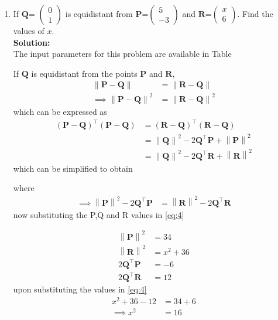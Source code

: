 \documentclass[12pt]{article}
\providecommand{\brak}[1]{\ensuremath{\left(#1\right)}}
\providecommand{\norm}[1]{\left\lVert#1\right\rVert}
\newcommand{\solution}{\noindent \textbf{Solution: }}
\newcommand{\myvec}[1]{\ensuremath{\begin{pmatrix}#1\end{pmatrix}}}
\let\vec\mathbf
\begin{document}
\begin{enumerate}

\item If $\vec{Q}$= $\myvec{0\\ 1}$  is equidistant from $\vec{P}$=$\myvec{5 \\ -3}$ and $\vec{R}$=$\myvec{x\\6}$. Find the values of $x$.\\

\solution \\The input parameters for this problem are available in Table
\begin{table}[ht!]\centering

\caption{}
\label{Table-1}	
\end{table}


  If $\vec{Q}$  is  equidistant from the points $\vec{P}$ and $\vec{R}$, 
\begin{align}
 \norm{\vec{P}-\vec{Q}} &=
\norm{\vec{R}-\vec{Q}} 
\\
 \implies \norm{\vec{P}-\vec{Q}}^2 &=
\norm{\vec{R}-\vec{Q}}^2 
\end{align}
which can be expressed as 
\begin{align}
 \brak{\vec{P}-\vec{Q}}^{\top} \brak{\vec{P}-\vec{Q}}&=
 \brak{\vec{R}-\vec{Q}}^{\top} 
\brak{\vec{R}-\vec{Q}}
\\ &= \norm{\vec{Q}}^2-2{\vec{Q}}^{\top}\vec{P} + \norm{\vec{P}}^2
 \\&= \norm{\vec{Q}}^2-2{\vec{Q}}^{\top}\vec{R} + \norm{\vec{R}}^2
\end{align}
which can be simplified to obtain
  
  where 
  \begin{align}
   \implies \norm{\vec{P}}^2-2{\vec{Q}}^{\top}\vec{P} &= \norm{\vec{R}}^2-2{\vec{Q}}^{\top}\vec{R} 
\label{eq:4} 
  \end{align}
  now substituting the P,Q and R values in \eqref{eq:4}

  \begin{align}
   \norm{\vec{P}}^2 &= 34
  \\ \norm{\vec{R}}^2 &= x^2+36
 \\2{\vec{Q}}^{\top}\vec{P} &= -6
 \\2{\vec{Q}}^{\top}\vec{R} &= 12
 \end{align}
upon   substituting the values in \eqref{eq:4}
\begin{align}
 x^2+36-12 &=34+6 
 \\ \implies  x^2 &=16
\end{align}


\end{enumerate}
\end{document}
